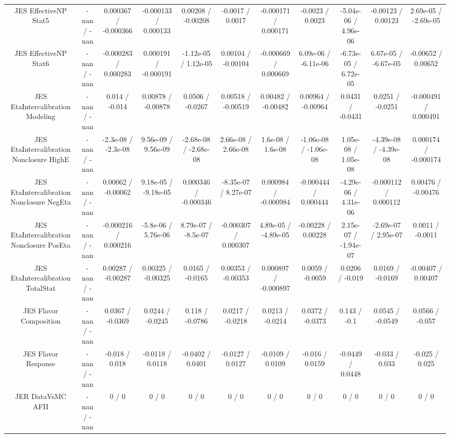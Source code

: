 \begin{table}[htbp]
\begin{center}
\begin{tabular}{|c|c|c|c|c|c|c|c|c|c|c|}
  JES EffectiveNP Stat5 & -nan / -nan & 0.000367 / -0.000366 & -0.000133 / 0.000133 & 0.00208 / -0.00208 & -0.0017 / 0.0017 & -0.000171 / 0.000171 & -0.0023 / 0.0023 & -5.04e-06 / 4.96e-06 & -0.00123 / 0.00123 & 2.69e-05 / -2.69e-05 \\ 
  JES EffectiveNP Stat6 & -nan / -nan & -0.000283 / 0.000283 & 0.000191 / -0.000191 & -1.12e-05 / 1.12e-05 & 0.00104 / -0.00104 & -0.000669 / 0.000669 & 6.09e-06 / -6.11e-06 & -6.73e-05 / 6.72e-05 & 6.67e-05 / -6.67e-05 & -0.00652 / 0.00652 \\ 
  JES EtaIntercalibration Modeling & -nan / -nan & 0.014 / -0.014 & 0.00878 / -0.00878 & 0.0506 / -0.0267 & 0.00518 / -0.00519 & 0.00482 / -0.00482 & 0.00964 / -0.00964 & 0.0431 / -0.0431 & 0.0251 / -0.0251 & -0.000491 / 0.000491 \\ 
  JES EtaIntercalibration Nonclosure HighE & -nan / -nan & -2.3e-08 / -2.3e-08 & 9.56e-09 / 9.56e-09 & -2.68e-08 / -2.68e-08 & 2.66e-08 / 2.66e-08 & 1.6e-08 / 1.6e-08 & -1.06e-08 / -1.06e-08 & 1.05e-08 / 1.05e-08 & -4.39e-08 / -4.39e-08 & 0.000174 / -0.000174 \\ 
  JES EtaIntercalibration Nonclosure NegEta & -nan / -nan & 0.00062 / -0.00062 & 9.18e-05 / -9.18e-05 & 0.000346 / -0.000346 & -8.35e-07 / 8.27e-07 & 0.000984 / -0.000984 & -0.000444 / 0.000444 & -4.29e-06 / 4.31e-06 & -0.000112 / 0.000112 & 0.00476 / -0.00476 \\ 
  JES EtaIntercalibration Nonclosure PosEta & -nan / -nan & -0.000216 / 0.000216 & -5.8e-06 / 5.76e-06 & 8.79e-07 / -8.5e-07 & -0.000307 / 0.000307 & 4.89e-05 / -4.89e-05 & -0.00228 / 0.00228 & 2.15e-07 / -1.94e-07 & -2.69e-07 / 2.95e-07 & 0.0011 / -0.0011 \\ 
  JES EtaIntercalibration TotalStat & -nan / -nan & 0.00287 / -0.00287 & 0.00325 / -0.00325 & 0.0165 / -0.0165 & 0.00353 / -0.00353 & 0.000897 / -0.000897 & 0.0059 / -0.0059 & 0.0206 / -0.019 & 0.0169 / -0.0169 & -0.00407 / 0.00407 \\ 
  JES Flavor Composition & -nan / -nan & 0.0367 / -0.0369 & 0.0244 / -0.0245 & 0.118 / -0.0786 & 0.0217 / -0.0218 & 0.0213 / -0.0214 & 0.0372 / -0.0373 & 0.143 / -0.1 & 0.0545 / -0.0549 & 0.0566 / -0.057 \\ 
  JES Flavor Response & -nan / -nan & -0.018 / 0.018 & -0.0118 / 0.0118 & -0.0402 / 0.0401 & -0.0127 / 0.0127 & -0.0109 / 0.0109 & -0.016 / 0.0159 & -0.0449 / 0.0448 & -0.033 / 0.033 & -0.025 / 0.025 \\ 
  JER DataVsMC AFII & -nan / -nan & 0 / 0 & 0 / 0 & 0 / 0 & 0 / 0 & 0 / 0 & 0 / 0 & 0 / 0 & 0 / 0 & 0 / 0 \\ 

\end{tabular}
\end{center}
\end{table}

